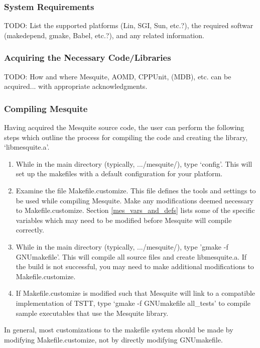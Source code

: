 \documentclass[psfig]{article}
\begin{document}
\subsubsection{System Requirements}
TODO:  List the supported platforms (Lin, SGI, Sun, etc.?), the required
softwar (makedepend, gmake, Babel, etc.?), and any related information.
\subsubsection{Acquiring the Necessary Code/Libraries}
TODO:  How and where Mesquite, AOMD, CPPUnit, (MDB), etc. can be
acquired... with appropriate acknowledgments.
\subsubsection{Compiling Mesquite}
Having acquired the Mesquite source code, the user can perform the
following steps which outline the process for compiling the code and
creating the library, `libmesquite.a'.
\begin{enumerate}

\item While in the main directory (typically, .../mesquite/), type
`config'.  This will set up the makefiles with a default configuration
for your platform.

\item Examine the file Makefile.customize.  This file defines
the tools and settings to be used while compiling Mesquite.  Make
any modifications deemed necessary to Makefile.customize.  Section
\ref{mes_vars_and_defs} lists some of the specific variables which
may need to be modified before Mesquite will compile correctly.

\item While in the main directory (typically, .../mesquite/),
type 'gmake -f GNUmakefile'.  This will compile all source files
and create libmesquite.a.  If the build is not successful, you may need
to make additional modifications to Makefile.customize.

\item If Makefile.customize is modified such that Mesquite will
link to a compatible implementation of TSTT, type `gmake -f GNUmakefile
all\_tests' to compile sample executables that use the Mesquite
library.

\end{enumerate}
In general, most customizations to the makefile system should be
made by modifying Makefile.customize, not by directly modifying
GNUmakefile.
\end{document}
